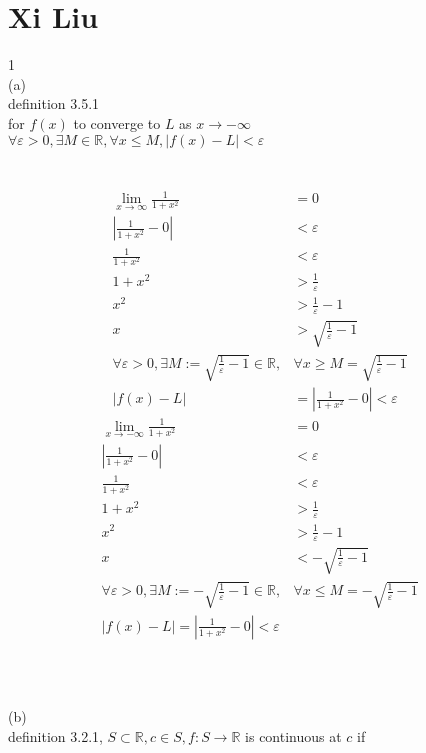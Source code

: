 \documentclass[12pt, border = 4pt, multi]{article} %
\begin{document}
\section*{Xi Liu}
1\\
(a)\\
definition 3.5.1\\
for $f(x)$ to converge to $L$ as $x \rightarrow -\infty$\\
$\forall \varepsilon > 0, \exists M \in \mathbb{R}, \forall x \leq M, |f(x) - L| < \varepsilon$\\
\\
\\
\begin{align*}
\lim_{x \rightarrow \infty} \frac{1}{1 + x ^ 2} &= 0\\
\left|\frac{1}{1 + x ^ 2} - 0\right| &< \varepsilon\\
\frac{1}{1 + x ^ 2} &< \varepsilon\\
1 + x ^ 2 &> \frac{1}{\varepsilon}\\
x ^ 2 &> \frac{1}{\varepsilon} - 1\\
x &> \sqrt{\frac{1}{\varepsilon} - 1}\\
\forall \varepsilon > 0, \exists M := \sqrt{\frac{1}{\varepsilon} - 1} \in \mathbb{R}, &\forall x \geq M = \sqrt{\frac{1}{\varepsilon} - 1}\\
|f(x) - L| &= \left|\frac{1}{1 + x ^ 2} - 0\right| < \varepsilon
\end{align*}
\begin{align*}
\lim_{x \rightarrow -\infty} \frac{1}{1 + x ^ 2} &= 0\\
\left|\frac{1}{1 + x ^ 2} - 0\right| &< \varepsilon\\
\frac{1}{1 + x ^ 2} &< \varepsilon\\
1 + x ^ 2 &> \frac{1}{\varepsilon}\\
x ^ 2 &> \frac{1}{\varepsilon} - 1\\
x &< -\sqrt{\frac{1}{\varepsilon} - 1}\\
\forall \varepsilon > 0, \exists M := -\sqrt{\frac{1}{\varepsilon} - 1} \in \mathbb{R}, &\forall x \leq M = -\sqrt{\frac{1}{\varepsilon} - 1}\\
|f(x) - L| = \left|\frac{1}{1 + x ^ 2} - 0\right| < \varepsilon\\
\end{align*}
\\
\\
\\
(b)\\
definition 3.2.1, $S \subset \mathbb{R}, c \in S, f: S \rightarrow \mathbb{R}$ is continuous at $c$ if\\
\end{document}

